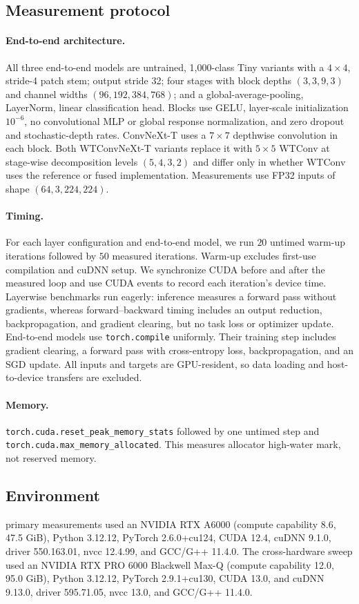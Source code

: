 
\subsection{Measurement protocol}

\paragraph{End-to-end architecture.}
All three end-to-end models are untrained, 1,000-class Tiny variants with a
$4\times4$, stride-4 patch stem; output stride 32; four stages with block depths
$(3,3,9,3)$ and channel widths $(96,192,384,768)$; and a global-average-pooling,
LayerNorm, linear classification head. Blocks use GELU, layer-scale
initialization $10^{-6}$, no convolutional MLP or global response normalization,
and zero dropout and stochastic-depth rates. ConvNeXt-T uses a $7\times7$
depthwise convolution in each block. Both WTConvNeXt-T variants replace it with
$5\times5$ WTConv at stage-wise decomposition levels $(5,4,3,2)$ and differ
only in whether WTConv uses the reference or fused implementation. Measurements
use FP32 inputs of shape $(64,3,224,224)$.

\paragraph{Timing.}
For each layer configuration and end-to-end model, we run $20$ untimed warm-up
iterations followed by $50$ measured iterations. Warm-up excludes first-use
compilation and cuDNN setup. We synchronize CUDA before and after the measured
loop and use CUDA events to record each iteration's device time. Layerwise
benchmarks run eagerly: inference measures a forward pass without gradients,
whereas forward--backward timing includes an output reduction, backpropagation,
and gradient clearing, but no task loss or optimizer update. End-to-end models
use \verb|torch.compile| uniformly. Their training step includes gradient
clearing, a forward pass with cross-entropy loss, backpropagation, and an SGD
update. All inputs and targets are GPU-resident, so data loading and host-to-device
transfers are excluded.

\paragraph{Memory.} \verb|torch.cuda.reset_peak_memory_stats| followed by one
untimed step and \verb|torch.cuda.max_memory_allocated|. This measures
allocator high-water mark, not reserved memory.


\subsection{Environment}

primary measurements used an NVIDIA RTX A6000 (compute capability 8.6, 47.5 GiB), Python 3.12.12, PyTorch 2.6.0+cu124, CUDA 12.4, cuDNN 9.1.0, driver 550.163.01, nvcc 12.4.99, and GCC/G++ 11.4.0. The cross-hardware sweep used an NVIDIA RTX PRO 6000 Blackwell Max-Q (compute capability 12.0, 95.0 GiB), Python 3.12.12, PyTorch 2.9.1+cu130, CUDA 13.0, and cuDNN 9.13.0, driver 595.71.05, nvcc 13.0, and GCC/G++ 11.4.0.
